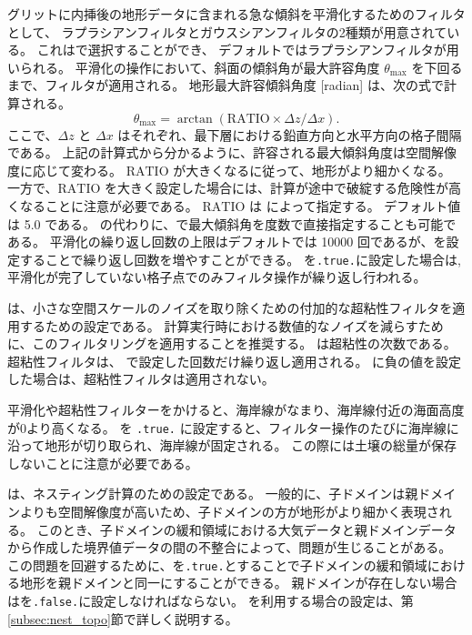 \scale グリットに内挿後の地形データに含まれる急な傾斜を平滑化するためのフィルタとして、
ラプラシアンフィルタとガウスシアンフィルタの2種類が用意されている。
これはで選択することができ、
デフォルトではラプラシアンフィルタが用いられる。
平滑化の操作において、斜面の傾斜角が最大許容角度 $\theta_{\max}$ を下回るまで、フィルタが適用される。
地形最大許容傾斜角度 [radian] は、次の式で計算される。
\begin{equation*}
  \theta_{\max} = \arctan( \mathrm{RATIO} \times \Delta z / \Delta x ).
\end{equation*}
ここで、$\Delta z$ と $\Delta x$ はそれぞれ、最下層における鉛直方向と水平方向の格子間隔である。
上記の計算式から分かるように、許容される最大傾斜角度は空間解像度に応じて変わる。
$\mathrm{RATIO}$ が大きくなるに従って、地形がより細かくなる。
一方で、$\mathrm{RATIO}$ を大きく設定した場合には、計算が途中で破綻する危険性が高くなることに注意が必要である。
$\mathrm{RATIO}$ は  によって指定する。
デフォルト値は 5.0 である。
 の代わりに、で最大傾斜角を度数で直接指定することも可能である。
平滑化の繰り返し回数の上限はデフォルトでは 10000 回であるが、を設定することで繰り返し回数を増やすことができる。
を\verb|.true.|に設定した場合は, 平滑化が完了していない格子点でのみフィルタ操作が繰り返し行われる。

は、小さな空間スケールのノイズを取り除くための付加的な超粘性フィルタを適用するための設定である。
計算実行時における数値的なノイズを減らすために、このフィルタリングを適用することを推奨する。
 は超粘性の次数である。
超粘性フィルタは、 で設定した回数だけ繰り返し適用される。
に負の値を設定した場合は、超粘性フィルタは適用されない。

平滑化や超粘性フィルターをかけると、海岸線がなまり、海岸線付近の海面高度が0より高くなる。
 を \verb|.true.| に設定すると、フィルター操作のたびに海岸線に沿って地形が切り取られ、海岸線が固定される。
この際には土壌の総量が保存しないことに注意が必要である。

は、ネスティング計算のための設定である。
一般的に、子ドメインは親ドメインよりも空間解像度が高いため、子ドメインの方が地形がより細かく表現される。
このとき、子ドメインの緩和領域における大気データと親ドメインデータから作成した境界値データの間の不整合によって、問題が生じることがある。
この問題を回避するために、を\verb|.true.|とすることで子ドメインの緩和領域における地形を親ドメインと同一にすることができる。
親ドメインが存在しない場合はを\verb|.false.|に設定しなければならない。
を利用する場合の設定は、第\ref{subsec:nest_topo}節で詳しく説明する。


